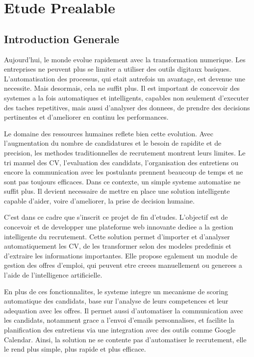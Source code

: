 \chapter{Etude Prealable}
\label{chap:etude-prealable}

\section{Introduction Generale}

Aujourd'hui, le monde evolue rapidement avec la transformation numerique. Les entreprises ne peuvent plus se limiter a utiliser des outils digitaux basiques. L'automatisation des processus, qui etait autrefois un avantage, est devenue une necessite. Mais desormais, cela ne suffit plus. Il est important de concevoir des systemes a la fois automatiques et intelligents, capables non seulement d'executer des taches repetitives, mais aussi d'analyser des donnees, de prendre des decisions pertinentes et d'ameliorer en continu les performances.

Le domaine des ressources humaines reflete bien cette evolution. Avec l'augmentation du nombre de candidatures et le besoin de rapidite et de precision, les methodes traditionnelles de recrutement montrent leurs limites. Le tri manuel des CV, l'evaluation des candidats, l'organisation des entretiens ou encore la communication avec les postulants prennent beaucoup de temps et ne sont pas toujours efficaces. Dans ce contexte, un simple systeme automatise ne suffit plus. Il devient necessaire de mettre en place une solution intelligente capable d'aider, voire d'ameliorer, la prise de decision humaine.

C'est dans ce cadre que s'inscrit ce projet de fin d'etudes. L'objectif est de concevoir et de developper une plateforme web innovante dediee a la gestion intelligente du recrutement. Cette solution permet d'importer et d'analyser automatiquement les CV, de les transformer selon des modeles predefinis et d'extraire les informations importantes. Elle propose egalement un module de gestion des offres d'emploi, qui peuvent etre creees manuellement ou generees a l'aide de l'intelligence artificielle.

En plus de ces fonctionnalites, le systeme integre un mecanisme de scoring automatique des candidats, base sur l'analyse de leurs competences et leur adequation avec les offres. Il permet aussi d'automatiser la communication avec les candidats, notamment grace a l'envoi d'emails personnalises, et facilite la planification des entretiens via une integration avec des outils comme Google Calendar. Ainsi, la solution ne se contente pas d'automatiser le recrutement, elle le rend plus simple, plus rapide et plus efficace.

